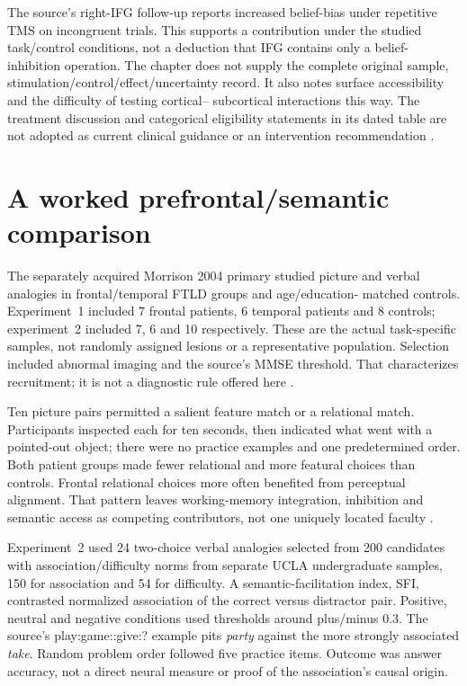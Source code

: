 The source's right-IFG follow-up reports increased belief-bias
under repetitive TMS on incongruent trials. This supports a
contribution under the studied task/control conditions, not a
deduction that IFG contains only a belief-inhibition operation.
The chapter does not supply the complete original sample,
stimulation/control/effect/uncertainty record. It also notes
surface accessibility and the difficulty of testing cortical--
subcortical interactions this way. The treatment discussion and
categorical eligibility statements in its dated table are not
adopted as current clinical guidance or an intervention recommendation
\cite[pp.~81--82]{MorrisonKnowlton2012Methods}.

\section{A worked prefrontal/semantic comparison}
\label{sec:p19-ncm-analogy}

The separately acquired Morrison 2004 primary studied picture and
verbal analogies in frontal/temporal FTLD groups and age/education-
matched controls. Experiment~1 included 7 frontal patients,
6 temporal patients and 8 controls; experiment~2 included 7, 6
and 10 respectively. These are the actual task-specific samples,
not randomly assigned lesions or a representative population.
Selection included abnormal imaging and the source's MMSE
threshold. That characterizes recruitment; it is not a diagnostic
rule offered here \cite[pp.~267--268]{MorrisonEtAl2004Analogy}.

Ten picture pairs permitted a salient feature match or a relational
match. Participants inspected each for ten seconds, then indicated
what went with a pointed-out object; there were no practice
examples and one predetermined order. Both patient groups made
fewer relational and more featural choices than controls. Frontal
relational choices more often benefited from perceptual alignment.
That pattern leaves working-memory integration, inhibition and
semantic access as competing contributors, not one uniquely located
faculty \cite[pp.~262--264, 267]{MorrisonEtAl2004Analogy}.

Experiment~2 used 24 two-choice verbal analogies selected from
200 candidates with association/difficulty norms from separate
UCLA undergraduate samples, 150 for association and 54 for
difficulty. A semantic-facilitation index, SFI, contrasted normalized
association of the correct versus distractor pair. Positive,
neutral and negative conditions used thresholds around plus/minus
0.3. The source's play:game::give:? example pits \emph{party}
against the more strongly associated \emph{take}. Random problem
order followed five practice items. Outcome was answer accuracy,
not a direct neural measure or proof of the association's causal origin.

